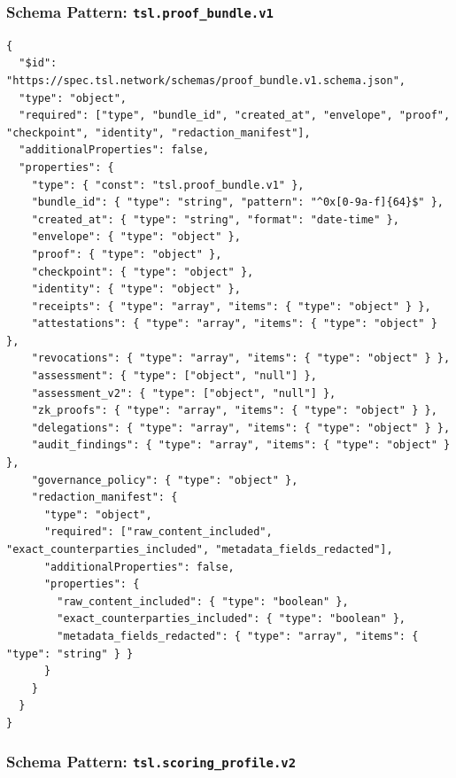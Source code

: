 \documentclass[11pt]{article}
\begin{document}
\subsubsection{Schema Pattern: \texttt{tsl.proof\_bundle.v1}}

\begin{lstlisting}[style=tslcode]
{
  "$id": "https://spec.tsl.network/schemas/proof_bundle.v1.schema.json",
  "type": "object",
  "required": ["type", "bundle_id", "created_at", "envelope", "proof", "checkpoint", "identity", "redaction_manifest"],
  "additionalProperties": false,
  "properties": {
    "type": { "const": "tsl.proof_bundle.v1" },
    "bundle_id": { "type": "string", "pattern": "^0x[0-9a-f]{64}$" },
    "created_at": { "type": "string", "format": "date-time" },
    "envelope": { "type": "object" },
    "proof": { "type": "object" },
    "checkpoint": { "type": "object" },
    "identity": { "type": "object" },
    "receipts": { "type": "array", "items": { "type": "object" } },
    "attestations": { "type": "array", "items": { "type": "object" } },
    "revocations": { "type": "array", "items": { "type": "object" } },
    "assessment": { "type": ["object", "null"] },
    "assessment_v2": { "type": ["object", "null"] },
    "zk_proofs": { "type": "array", "items": { "type": "object" } },
    "delegations": { "type": "array", "items": { "type": "object" } },
    "audit_findings": { "type": "array", "items": { "type": "object" } },
    "governance_policy": { "type": "object" },
    "redaction_manifest": {
      "type": "object",
      "required": ["raw_content_included", "exact_counterparties_included", "metadata_fields_redacted"],
      "additionalProperties": false,
      "properties": {
        "raw_content_included": { "type": "boolean" },
        "exact_counterparties_included": { "type": "boolean" },
        "metadata_fields_redacted": { "type": "array", "items": { "type": "string" } }
      }
    }
  }
}
\end{lstlisting}

\subsubsection{Schema Pattern: \texttt{tsl.scoring\_profile.v2}}
\end{document}
